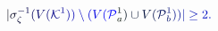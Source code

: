\documentclass[12pt]{article}
\begin{document}
\makeatletter
\renewcommand*{\@textcolor}[3]{%
  \protect\leavevmode
  \begingroup
    \color#1{#2}#3%
  \endgroup
}
\makeatother
\begin{displaymath}
\mathcolor[RGB]{0,0,15}{|} \mathcolor[RGB]{0,0,30}{\sigma} _ { \mathcolor[RGB]{0,0,45}{\zeta} } ^ { \mathcolor[RGB]{0,0,60}{-} \mathcolor[RGB]{0,0,75}{1} } \mathcolor[RGB]{0,0,90}{(} \mathcolor[RGB]{0,0,105}{V} \mathcolor[RGB]{0,0,120}{(} \mathcal { \mathcolor[RGB]{0,0,135}{K} } ^ { \mathcolor[RGB]{0,0,150}{1} } \mathcolor[RGB]{0,0,165}{)} \mathcolor[RGB]{0,0,180}{)} \mathcolor[RGB]{0,0,195}{\setminus} \mathcolor[RGB]{0,0,210}{(} \mathcolor[RGB]{0,0,225}{V} \mathcolor[RGB]{0,0,240}{(} \mathcal { \mathcolor[RGB]{0,0,255}{P} } _ { \mathcolor[RGB]{0,15,0}{a} } ^ { \mathcolor[RGB]{0,15,15}{1} } \mathcolor[RGB]{0,15,30}{)} \mathcolor[RGB]{0,15,45}{\cup} \mathcolor[RGB]{0,15,60}{V} \mathcolor[RGB]{0,15,75}{(} \mathcal { \mathcolor[RGB]{0,15,90}{P} } _ { \mathcolor[RGB]{0,15,105}{b} } ^ { \mathcolor[RGB]{0,15,120}{1} } \mathcolor[RGB]{0,15,135}{)} \mathcolor[RGB]{0,15,150}{)} \mathcolor[RGB]{0,15,165}{|} \mathcolor[RGB]{0,15,180}{\geq} \mathcolor[RGB]{0,15,195}{2} \mathcolor[RGB]{0,15,210}{.}
\end{displaymath}
\end{document}

